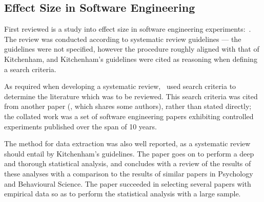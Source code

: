 \subsection{Effect Size in Software Engineering}
First reviewed is a study into effect size in software engineering experiments:~\citet*{Kampenes2007}. The review was conducted according to systematic review guidelines --- the guidelines were not specified, however the procedure roughly aligned with that of Kitchenham, and Kitchenham's guidelines were cited as reasoning when defining a search criteria.\par

As required when developing a systematic review,~\cite{Kampenes2007} used search criteria to determine the literature which was to be reviewed. This search criteria was cited from another paper (\cite{Sjoberg2005}, which shares some authors), rather than stated directly; the collated work was a set of software engineering papers exhibiting controlled experiments published over the span of 10 years.\par

The method for data extraction was also well reported, as a systematic review should entail by Kitchenham's guidelines. The paper goes on to perform a deep and thorough statistical analysis, and concludes with a review of the results of these analyses with a comparison to the results of similar papers in Psychology and Behavioural Science. The paper succeeded in selecting several papers with empirical data so as to perform the statistical analysis with a large sample.\par

